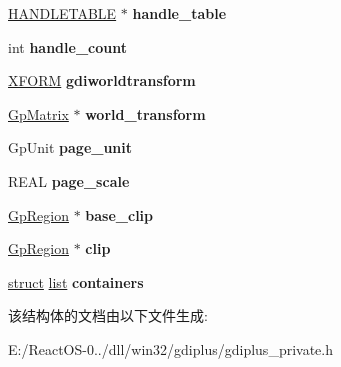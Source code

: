 \begin{DoxyCompactItemize}
\hyperlink{structtag_h_a_n_d_l_e_t_a_b_l_e}{H\+A\+N\+D\+L\+E\+T\+A\+B\+LE} $\ast$ {\bfseries handle\+\_\+table}
\item 
\mbox{\label{struct_gp_metafile_a386c33d8d38404390fb9c6596caaa9e8}} 
int {\bfseries handle\+\_\+count}
\item 
\mbox{\label{struct_gp_metafile_ae3bffcd96e2ee800c6053ea39ccf6066}} 
\hyperlink{struct___x_f_o_r_m}{X\+F\+O\+RM} {\bfseries gdiworldtransform}
\item 
\mbox{\label{struct_gp_metafile_a7580238a976e83a7a31fcab1890683f1}} 
\hyperlink{struct_gp_matrix}{Gp\+Matrix} $\ast$ {\bfseries world\+\_\+transform}
\item 
\mbox{\label{struct_gp_metafile_ac3d7004fba83b1cbdac5fb61c4d4e726}} 
Gp\+Unit {\bfseries page\+\_\+unit}
\item 
\mbox{\label{struct_gp_metafile_a5ada6e947c87680f881e4fe0cdf3449d}} 
R\+E\+AL {\bfseries page\+\_\+scale}
\item 
\mbox{\label{struct_gp_metafile_a390977266568b6fc1daeacb38a3416ef}} 
\hyperlink{struct_gp_region}{Gp\+Region} $\ast$ {\bfseries base\+\_\+clip}
\item 
\mbox{\label{struct_gp_metafile_adb9fde91a02b81a25760d22ddff80154}} 
\hyperlink{struct_gp_region}{Gp\+Region} $\ast$ {\bfseries clip}
\item 
\mbox{\label{struct_gp_metafile_a75223d41754a5dd1c428b86fd936a3e2}} 
\hyperlink{interfacestruct}{struct} \hyperlink{classlist}{list} {\bfseries containers}
\end{DoxyCompactItemize}


该结构体的文档由以下文件生成\+:\begin{DoxyCompactItemize}
\item 
E\+:/\+React\+O\+S-\/0../dll/win32/gdiplus/gdiplus\+\_\+private.\+h\end{DoxyCompactItemize}
